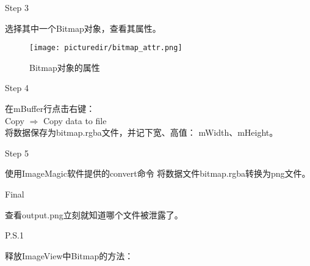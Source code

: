 ﻿\documentclass{beamer}
\begin{document}
  \begin{frame}{Step 3}
  \begin{framedtext}
    选择其中一个Bitmap对象，查看其属性。
  \end{framedtext}
  \end{frame}

  \begin{frame}
    \begin{figure}
      \centering
      \texttt{[image: picturedir/bitmap\_attr.png]}\\
      \caption{Bitmap对象的属性}\label{fig:attr}
    \end{figure}
  \end{frame}

  \begin{frame}{Step 4}
  \begin{framedtext}
    在mBuffer行点击右键：\\
    Copy $\Rightarrow$ Copy data to file\\
    将数据保存为bitmap.rgba文件，并记下宽、高值：
    mWidth、mHeight。
  \end{framedtext}
  \end{frame}

  \begin{frame}{Step 5}
  \begin{framedtext}
    使用ImageMagic软件提供的convert命令
    将数据文件bitmap.rgba转换为png文件。
  \end{framedtext}
  \end{frame}

  \begin{frame}
  \end{frame}

  \begin{frame}{Final}
  \begin{framedtext}
    查看output.png立刻就知道哪个文件被泄露了。
  \end{framedtext}
  \end{frame}

  \begin{frame}{P.S.1}
    \begin{framedtext}
      释放ImageView中Bitmap的方法：
    \end{framedtext}
  \end{frame}
\end{document}
